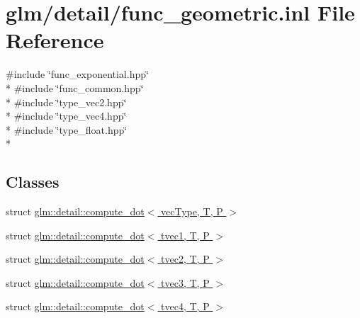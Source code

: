 \hypertarget{func__geometric_8inl}{\section{glm/detail/func\-\_\-geometric.inl File Reference}
\label{func__geometric_8inl}
}
{\ttfamily \#include \char`\"{}func\-\_\-exponential.\-hpp\char`\"{}}\\*
{\ttfamily \#include \char`\"{}func\-\_\-common.\-hpp\char`\"{}}\\*
{\ttfamily \#include \char`\"{}type\-\_\-vec2.\-hpp\char`\"{}}\\*
{\ttfamily \#include \char`\"{}type\-\_\-vec4.\-hpp\char`\"{}}\\*
{\ttfamily \#include \char`\"{}type\-\_\-float.\-hpp\char`\"{}}\\*
\subsection*{Classes}
\begin{DoxyCompactItemize}
\item 
struct \hyperlink{structglm_1_1detail_1_1compute__dot}{glm\-::detail\-::compute\-\_\-dot$<$ vec\-Type, T, P $>$}
\item 
struct \hyperlink{structglm_1_1detail_1_1compute__dot_3_01tvec1_00_01T_00_01P_01_4}{glm\-::detail\-::compute\-\_\-dot$<$ tvec1, T, P $>$}
\item 
struct \hyperlink{structglm_1_1detail_1_1compute__dot_3_01tvec2_00_01T_00_01P_01_4}{glm\-::detail\-::compute\-\_\-dot$<$ tvec2, T, P $>$}
\item 
struct \hyperlink{structglm_1_1detail_1_1compute__dot_3_01tvec3_00_01T_00_01P_01_4}{glm\-::detail\-::compute\-\_\-dot$<$ tvec3, T, P $>$}
\item 
struct \hyperlink{structglm_1_1detail_1_1compute__dot_3_01tvec4_00_01T_00_01P_01_4}{glm\-::detail\-::compute\-\_\-dot$<$ tvec4, T, P $>$}
\end{DoxyCompactItemize}
